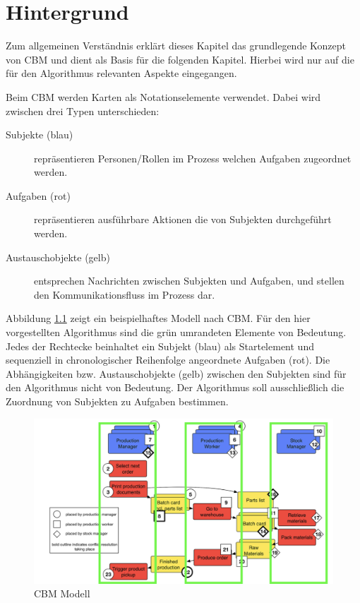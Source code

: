 %
%
% 
% 
% 

\chapter{Hintergrund} %
\label{cha:hintergrund}
Zum allgemeinen Verständnis erklärt dieses Kapitel das grundlegende Konzept von CBM und dient als Basis für die folgenden Kapitel. Hierbei wird nur auf die für den Algorithmus relevanten Aspekte eingegangen. 

Beim CBM werden Karten als Notationselemente verwendet. Dabei wird zwischen drei Typen unterschieden:
\begin{description}
	\item[Subjekte (blau)] repräsentieren Personen/Rollen im Prozess welchen Aufgaben zugeordnet werden.
	\item[Aufgaben (rot)] repräsentieren ausführbare Aktionen die von Subjekten durchgeführt werden.
	\item[Austauschobjekte (gelb)] entsprechen Nachrichten zwischen Subjekten und Aufgaben, und stellen den Kommunikationsfluss im Prozess dar.
\end{description}

Abbildung \ref{fig:cbm-grundstruktur} zeigt ein beispielhaftes Modell nach CBM. Für den hier vorgestellten Algorithmus sind die grün umrandeten Elemente von Bedeutung. Jedes der Rechtecke beinhaltet ein Subjekt (blau) als Startelement und sequenziell in chronologischer Reihenfolge angeordnete Aufgaben (rot). Die Abhängigkeiten bzw. Austauschobjekte (gelb) zwischen den Subjekten sind für den Algorithmus nicht von Bedeutung. Der Algorithmus soll ausschließlich die Zuordnung von Subjekten zu Aufgaben bestimmen.
\begin{figure}[H]
	\centering 
	\begin{minipage}[b]{0.9\textwidth} 
		\includegraphics[width=\textwidth]{figures/cbm-grundstruktur.png} 		\caption{CBM Modell 
		\protect~\cite{oppl2016linking}} 
		\label{fig:cbm-grundstruktur} 
	\end{minipage}
\end{figure}
